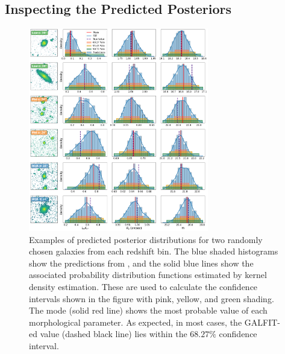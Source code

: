 \subsection{Inspecting the Predicted Posteriors}

\begin{figure}[htb]
    \centering
    \includegraphics[width = 0.7\textwidth]{example_pred_dists.png}
    \caption{Examples of predicted posterior distributions for two randomly chosen galaxies from each redshift bin. The blue shaded histograms show the predictions from \gampen{}, and the solid blue lines show the associated probability distribution functions estimated by kernel density estimation. These are used to calculate the confidence intervals shown in the figure with pink, yellow, and green shading. The mode (solid red line) shows the most probable value of each morphological parameter. As expected, in most cases, the GALFIT-ed value (dashed black line) lies within the $68.27\%$ confidence interval.}
    \label{fig_c3:example_pred_dists}
\end{figure}


